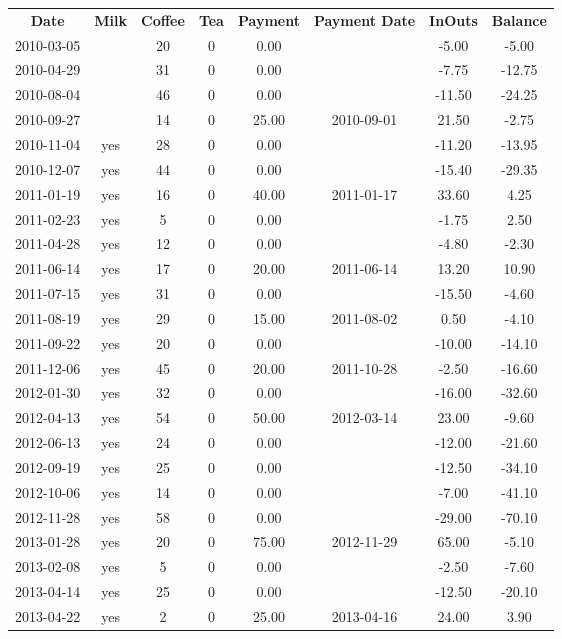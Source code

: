 \begin{center}
\begin{tabular}{cccccccc}
\textbf{Date} & \textbf{Milk} & \textbf{Coffee} & \textbf{Tea} & \textbf{Payment} & \textbf{Payment Date} & \textbf{InOuts} & \textbf{Balance} \\
2010-03-05 &  & 20 & 0 &  0.00 &  &  -5.00 &  -5.00\\ 
2010-04-29 &  & 31 & 0 &  0.00 &  &  -7.75 & -12.75\\ 
2010-08-04 &  & 46 & 0 &  0.00 &  & -11.50 & -24.25\\ 
2010-09-27 &  & 14 & 0 & 25.00 & 2010-09-01 &  21.50 &  -2.75\\ 
2010-11-04 & yes & 28 & 0 &  0.00 &  & -11.20 & -13.95\\ 
2010-12-07 & yes & 44 & 0 &  0.00 &  & -15.40 & -29.35\\ 
2011-01-19 & yes & 16 & 0 & 40.00 & 2011-01-17 &  33.60 &   4.25\\ 
2011-02-23 & yes &  5 & 0 &  0.00 &  &  -1.75 &   2.50\\ 
2011-04-28 & yes & 12 & 0 &  0.00 &  &  -4.80 &  -2.30\\ 
2011-06-14 & yes & 17 & 0 & 20.00 & 2011-06-14 &  13.20 &  10.90\\ 
2011-07-15 & yes & 31 & 0 &  0.00 &  & -15.50 &  -4.60\\ 
2011-08-19 & yes & 29 & 0 & 15.00 & 2011-08-02 &   0.50 &  -4.10\\ 
2011-09-22 & yes & 20 & 0 &  0.00 &  & -10.00 & -14.10\\ 
2011-12-06 & yes & 45 & 0 & 20.00 & 2011-10-28 &  -2.50 & -16.60\\ 
2012-01-30 & yes & 32 & 0 &  0.00 &  & -16.00 & -32.60\\ 
2012-04-13 & yes & 54 & 0 & 50.00 & 2012-03-14 &  23.00 &  -9.60\\ 
2012-06-13 & yes & 24 & 0 &  0.00 &  & -12.00 & -21.60\\ 
2012-09-19 & yes & 25 & 0 &  0.00 &  & -12.50 & -34.10\\ 
2012-10-06 & yes & 14 & 0 &  0.00 &  &  -7.00 & -41.10\\ 
2012-11-28 & yes & 58 & 0 &  0.00 &  & -29.00 & -70.10\\ 
2013-01-28 & yes & 20 & 0 & 75.00 & 2012-11-29 &  65.00 &  -5.10\\ 
2013-02-08 & yes &  5 & 0 &  0.00 &  &  -2.50 &  -7.60\\ 
2013-04-14 & yes & 25 & 0 &  0.00 &  & -12.50 & -20.10\\ 
2013-04-22 & yes &  2 & 0 & 25.00 & 2013-04-16 &  24.00 &   3.90
\end{tabular}
\end{center}


